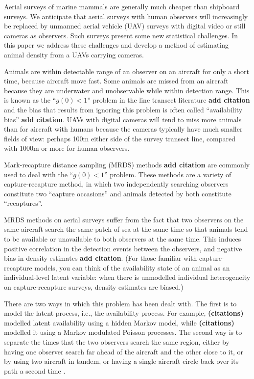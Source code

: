 \documentclass[useAMS, usenatbib, referee]{biom}\usepackage[]{graphicx}\usepackage[]{color}
\begin{document}
Aerial surveys of marine mammals are generally much cheaper than shipboard surveys. We anticipate that aerial surveys with human observers will increasingly be replaced by unmanned aerial vehicle (UAV) surveys with digital video or still cameras as observers. Such surveys present some new statistical challenges. In this paper we address these challenges and develop a method of estimating animal density from a UAVs carrying cameras.

Animals are within detectable range of an observer on an aircraft for only a short time, because aircraft move fast. Some animals are missed from an aircraft because they are underwater and unobservable while within detection range. This is known as the ``$g(0)<1$'' problem in the line transect literature \textbf{add citation} and the bias that results from ignoring this problem is often called ``availability bias'' \textbf{add citation}. UAVs with digital cameras will tend to miss more animals than for aircraft with humans because the cameras typically have much smaller fields of view: perhaps 100m either side of the survey transect line, compared with 1000m or more for human observers.

Mark-recapture distance sampling (MRDS) methods \textbf{add citation} are commonly used to deal with the ``$g(0)<1$''  problem. These methods are a variety of capture-recapture method, in which two independently searching observers constitute two ``capture occasions'' and animals detected by both constitute ``recaptures''. 

MRDS methods on aerial surveys suffer from the fact that two observers on the same aircraft search the same patch of sea at the same time so that animals tend to be available or unavailable to both observers at the same time. This induces positive correlation in the detection events between the observers, and negative bias in density estimates \textbf{add citation}. (For those familiar with capture-recapture models, you can think of the availability state of an animal as an individual-level latent variable: when there is unmodelled individual heterogeneity on capture-recapture surveys, density estimates are biased.) 

There are two ways in which this problem has been dealt with. The first is to model the latent process, i.e., the availability process. For example, \textbf{(citations)} modelled latent availability using a hidden Markov model, while \textbf{(citations)} modelled it using a Markov modulated Poisson processes. The second way is to separate the times that the two observers search the same region, either by having one observer search far ahead of the aircraft and the other close to it, or by using two aircraft in tandem, or having a single aircraft circle back over its path a second time \citep[see][(need to add others too?)]{Hiby+Lovell:98}.
\end{document}
